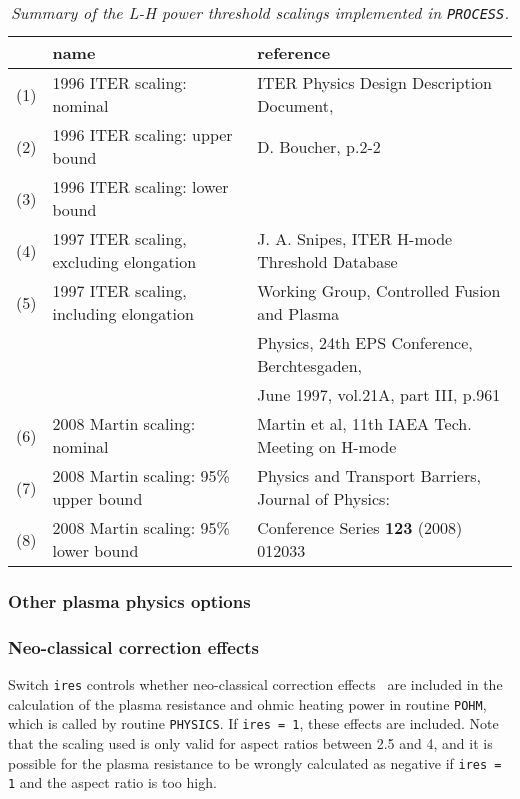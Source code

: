 \documentclass[11pt,a4paper]{report}
\newcommand{\process}{\mbox{\texttt{PROCESS}}}
\begin{document}
\begin{table}[tbph]
\small
\begin{center}
\begin{tabular}{||c||l||l||} \hline
 & name & reference \\ \hline
(1) & 1996 ITER scaling: nominal & ITER Physics Design Description Document, \\
(2) & 1996 ITER scaling: upper bound & D. Boucher, p.2-2 \\
(3) & 1996 ITER scaling: lower bound &  \\ \hline
(4) & 1997 ITER scaling, excluding elongation & J. A. Snipes, ITER H-mode
Threshold Database \\
(5) & 1997 ITER scaling, including elongation &  Working Group, Controlled
Fusion and Plasma \\
 & & Physics, 24th EPS Conference, Berchtesgaden, \\
 & & June 1997, vol.21A, part III, p.961 \\ \hline
(6) & 2008 Martin scaling: nominal & Martin et al, 11th IAEA Tech. Meeting on
H-mode \\
(7) & 2008 Martin scaling: 95\% upper bound &  Physics and Transport Barriers,
Journal of Physics: \\
(8) & 2008 Martin scaling: 95\% lower bound & Conference Series \textbf{123}
(2008) 012033 \\
\hline
\end{tabular}
\end{center}
\normalsize
\caption[List of available L-H power threshold scalings]
{\label{tab:power_thresholds}
  \textit{Summary of the L-H power threshold scalings implemented in \process.}
}
\end{table}

\subsubsection{Other plasma physics options}

\subsubsection*{Neo-classical correction effects}

Switch \texttt{ires} controls whether neo-classical correction
effects~\cite{Uckan} are included in the calculation of the plasma resistance
and ohmic heating power in routine \texttt{POHM}, which is called by routine
\texttt{PHYSICS}. If \texttt{ires = 1}, these effects are included. Note that
the scaling used is only valid for aspect ratios between 2.5 and 4, and it is
possible for the plasma resistance to be wrongly calculated as negative if
\texttt{ires = 1} and the aspect ratio is too high.
\end{document}
